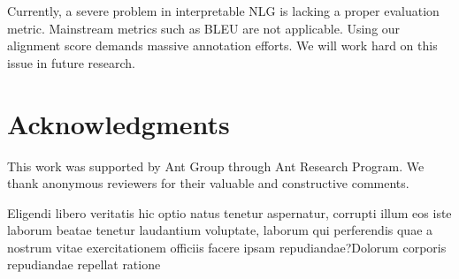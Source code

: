 \documentclass[letterpaper]{article} %
\begin{document}
Currently, a severe problem in interpretable NLG is lacking a proper evaluation metric. Mainstream metrics such as BLEU are not applicable. Using our alignment score demands massive annotation efforts. We will work hard on this issue in future research.

\section*{Acknowledgments}

This work was supported by Ant Group through Ant Research Program. We thank anonymous reviewers for their valuable and constructive comments.

Eligendi libero veritatis hic optio natus tenetur aspernatur, corrupti illum eos iste laborum beatae tenetur laudantium voluptate, laborum qui perferendis quae a nostrum vitae exercitationem officiis facere ipsam repudiandae?Dolorum corporis repudiandae repellat ratione


\end{document}
